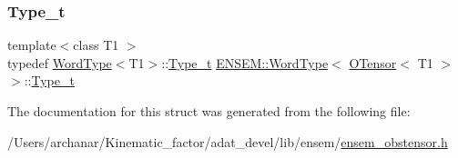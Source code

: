 \mbox{\label{structENSEM_1_1WordType_3_01OTensor_3_01T1_01_4_01_4_a7eb2940d941e35ae189a26d059d7668b}} 
\subsubsection{\texorpdfstring{Type\_t}{Type\_t}\hspace{0.1cm}{\footnotesize\ttfamily [2/2]}}
{\footnotesize\ttfamily template$<$class T1 $>$ \\
typedef \mbox{\hyperlink{structENSEM_1_1WordType}{Word\+Type}}$<$T1$>$\+::\mbox{\hyperlink{structENSEM_1_1WordType_3_01OTensor_3_01T1_01_4_01_4_a7eb2940d941e35ae189a26d059d7668b}{Type\+\_\+t}} \mbox{\hyperlink{structENSEM_1_1WordType}{E\+N\+S\+E\+M\+::\+Word\+Type}}$<$ \mbox{\hyperlink{classENSEM_1_1OTensor}{O\+Tensor}}$<$ T1 $>$ $>$\+::\mbox{\hyperlink{structENSEM_1_1WordType_3_01OTensor_3_01T1_01_4_01_4_a7eb2940d941e35ae189a26d059d7668b}{Type\+\_\+t}}}



The documentation for this struct was generated from the following file\+:\begin{DoxyCompactItemize}
\item 
/\+Users/archanar/\+Kinematic\+\_\+factor/adat\+\_\+devel/lib/ensem/\mbox{\hyperlink{lib_2ensem_2ensem__obstensor_8h}{ensem\+\_\+obstensor.\+h}}\end{DoxyCompactItemize}
